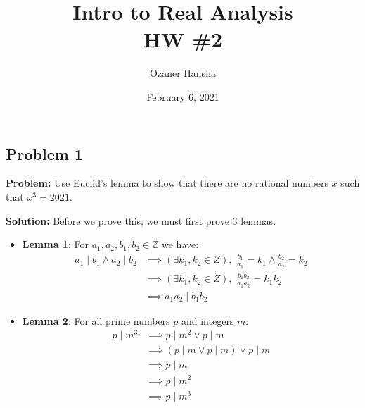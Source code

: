 \documentclass{article}
\newcommand{\Z}{\mathbb Z}
\newcommand{\divides}{\mid}
\begin{document}
\title{Intro to Real Analysis\\HW \#2}
\author{Ozaner Hansha}
\date{February 6, 2021}
\maketitle

\subsection*{Problem 1}
\noindent\textbf{Problem:} Use Euclid's lemma to show that there are no rational numbers $x$ such that $x^3=2021$.
\bigskip

\noindent\textbf{Solution:} Before we prove this, we must first prove 3 lemmas.
\begin{itemize}
  \item \textbf{Lemma 1}: For $a_1,a_2,b_1,b_2\in\Z$ we have:
  \begin{align*}
    a_1\divides b_1\wedge a_2\divides b_2&\implies(\exists k_1,k_2\in Z),\,\,\frac{b_1}{a_1}=k_1\wedge\frac{b_2}{a_2}=k_2\tag{def. of divisibility}\\
    &\implies(\exists k_1,k_2\in Z),\,\,\frac{b_1b_2}{a_1a_2}=k_1k_2\\
    &\implies a_1a_2\divides b_1b_2\tag{$\Z$ closed under multiplication}
  \end{align*}
  \item \textbf{Lemma 2}: For all prime numbers $p$ and integers $m$: 
  \begin{align*}
    p\divides m^3&\implies p\divides m^2\vee p\divides m\tag{Euclid's lemma}\\
    &\implies (p\divides m\vee p\divides m)\vee p\divides m\tag{Euclid's lemma}\\
    &\implies p\divides m\\
    &\implies p\divides m^2\tag{lemma 1, $1\divides m$}\\
    &\implies p\divides m^3\tag{lemma 1, $1\divides m$}
  \end{align*}

\end{itemize}
\end{document}
